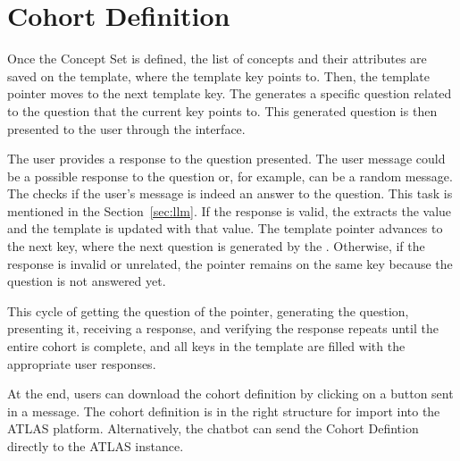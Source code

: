 \section{Cohort Definition}




Once the Concept Set is defined, the list of concepts and their attributes are saved on the template, where the template key points to. Then, the template pointer moves to the next template key. The {\llm} generates a specific question related to the question that the current key points to. This generated question is then presented to the user through the interface.

The user provides a response to the question presented. The user message could be a possible response to the question or, for example, can be a random message. The {\llm} checks if the user's message is indeed an answer to the question. This task is mentioned in the Section~\ref{sec:llm}. If the response is valid, the {\llm} extracts the value and the template is updated with that value. The template pointer advances to the next key, where the next question is generated by the {\llm}. Otherwise, if the response is invalid or unrelated, the pointer remains on the same key because the question is not answered yet.

This cycle of getting the question of the pointer, generating the question, presenting it, receiving a response, and verifying the response repeats until the entire cohort is complete, and all keys in the template are filled with the appropriate user responses.

At the end, users can download the cohort definition by clicking on a button sent in a message. The cohort definition is in the right structure for import into the ATLAS platform. Alternatively, the chatbot can send the Cohort Defintion directly to the ATLAS instance.


